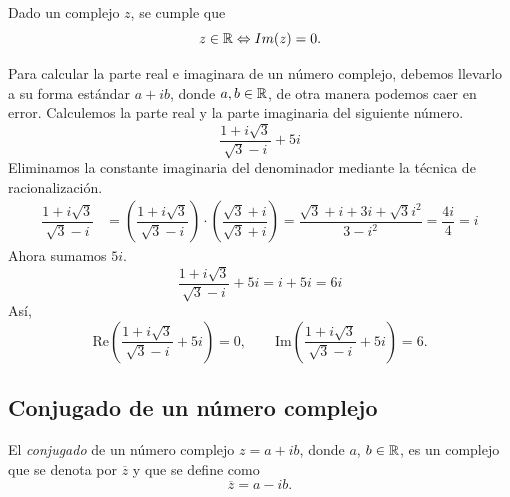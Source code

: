 \medskip

\begin{prop}
Dado un complejo $z$, se cumple que 
$$ z\in\mathbb{R}\Leftrightarrow Im(z)=0.$$
\end{prop}

\begin{ejemplo}
Para calcular la parte real e imaginara de un número complejo, debemos llevarlo a su forma estándar $a+ib$, donde $a,b\in\mathbb{R}$, de otra manera podemos caer en error.
    Calculemos la parte real y la parte imaginaria del siguiente número.
	$$\dfrac{1+i\sqrt{3}}{\sqrt{3}-i}+5i$$	
	Eliminamos la constante imaginaria del denominador mediante la técnica de racionalización.
	\begin{align*}
        \dfrac{1+i\sqrt{3}}{\sqrt{3}-i} &= 
            \left(\dfrac{1+i\sqrt{3}}{\sqrt{3}-i}\right)
            \cdot \left(\dfrac{\sqrt{3}+i}{\sqrt{3}+i}\right)
            = \dfrac{\sqrt{3}+i+3i+\sqrt{3}i^2}{3-i^2} = \dfrac{4i}{4} = i
	\end{align*}
	Ahora sumamos $5i$.
	\[
        \dfrac{1+i\sqrt{3}}{\sqrt{3}-i}+5i = i + 5i = 6i
	\]
	Así,
	\[
        \mbox{Re}\left(\dfrac{1+i\sqrt{3}}{\sqrt{3}-i}+5i\right) = 0,
        \qquad 
        \mbox{Im}\left(\dfrac{1+i\sqrt{3}}{\sqrt{3}-i}+5i\right) = 6.
	\]
\end{ejemplo}



\subsection{Conjugado de un número complejo}

\begin{defn}
El \emph{conjugado} de un número complejo $z=a+ib$, donde $a$, $b\in\mathbb{R}$, es un complejo que se denota por $\overline{z}$ y que se define como
$$ \overline{z}=a-ib.$$
 \end{defn}

